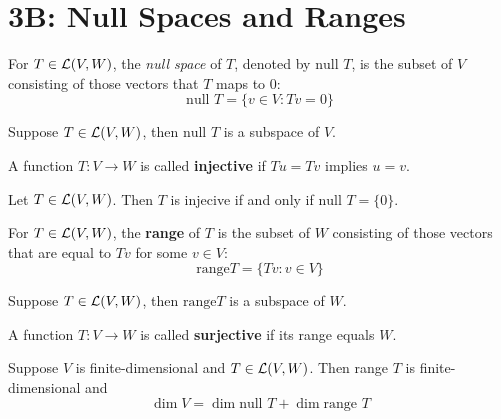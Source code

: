\documentclass{extarticle}
\begin{document}
\newpage 


\section*{3B: Null Spaces and Ranges}

\begin{definition}
    For \(T \in \mathcal{L}(V, W)\), the \emph{null space} of \(T\), denoted by \(\text{null } T\), is the subset of 
    \(V\) consisting of those vectors that \(T\) maps to 0:
    \[\text{null } T = \{v \in V \colon Tv = 0\}\]
\end{definition}

\begin{corollary}
    Suppose \(T \in \mathcal{L}(V, W)\), then \(\text{null } T\) is a subspace of \(V\). 
\end{corollary}

\begin{definition}[injective]
    A function \(T \colon V \to W\) is called \textbf{injective} if \(Tu = Tv\) implies \(u = v\). 
\end{definition}

\begin{thm}
    Let \(T \in \mathcal{L}(V, W)\). Then \(T\) is injecive if and only if \(\text{null } T = \{0\}\). 
\end{thm}

\begin{definition}[range]
    For \(T \in \mathcal{L}(V, W)\), the \textbf{range} of \(T\) is the subset of \(W\) consisting of those 
    vectors that are equal to \(T v\) for some \(v \in V\):
    \[\text{range} T = \{Tv \colon v \in V\}\]
\end{definition}

\begin{corollary}
    Suppose \(T \in \mathcal{L}(V, W)\), then \(\text{range} T\) is a subspace of \(W\). 
\end{corollary}

\begin{definition}[surjective]
    A function \(T \colon V \to W\) is called \textbf{surjective} if its range equals \(W\). 
\end{definition}


\begin{thm}
    Suppose \(V\) is finite-dimensional and \(T \in \mathcal{L}(V, W)\). Then range \(T\) is finite-dimensional 
    and 
    \[\dim V = \dim \text{null } T + \dim \text{range } T\]
\end{thm}
\end{document}
